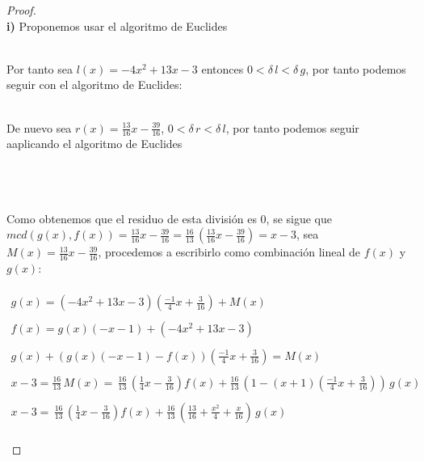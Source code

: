 \documentclass[11pt,letterpaper]{article}
\begin{document}
\begin{proof}\,\\
    \textbf{i)}\,\,Proponemos usar el algoritmo de Euclides
    \,\\
    \begin{center}
\end{center}\,\\
Por tanto sea $l(x)=-4x^2+13x-3$ entonces $0<\delta\,l< \delta\,g$, por tanto podemos seguir con el algoritmo 
de Euclides:\,\\
\begin{center}
\end{center}\,\\
De nuevo sea $r(x)=\frac{13}{16}x-\frac{39}{16}$, $0<\delta\,r<\delta\,l$, por tanto podemos seguir aaplicando el algoritmo de Euclides\,\\
\,\\
\begin{center}
\end{center}\,\\
\newpage
\,\\
Como obtenemos que el residuo de esta divisi\'on es $0$, se sigue que\\ $mcd(g(x),f(x))=\frac{13}{16}x-\frac{39}{16}=\frac{16}{13}\,(\frac{13}{16}x-\frac{39}{16})=x-3$, sea
$M(x)=\frac{13}{16}x-\frac{39}{16}$, procedemos a escribirlo como combinaci\'on lineal de $f(x)$ y $g(x)$:\,\\
\,\\
\begin{align*}
    g(x)=(-4x^2+13x-3)\left(\frac{-1}{4}x+\frac{3}{16}\right)+M(x)\,\\
    \,\\
    f(x)=g(x)(-x-1)+(-4x^2+13x-3)\,\\
    \,\\
    g(x)+(g(x)(-x-1)-f(x))\left(\frac{-1}{4}x+\frac{3}{16}\right)=M(x)\,\\
    \,\\
    x-3=\frac{16}{13}\,M(x)=\,\frac{16}{13}\,\left(\frac{1}{4}x-\frac{3}{16}\right)f(x)+\frac{16}{13}\,\left(1-(x+1)\left(\frac{-1}{4}x+\frac{3}{16}\right)\right)\,g(x)\,\\
    \,\\
    x-3=\,\frac{16}{13}\,\left(\frac{1}{4}x-\frac{3}{16}\right)f(x)+\frac{16}{13}\,\left(\frac{13}{16}+\frac{x^2}{4}+\frac{x}{16}\right)\,g(x)
\end{align*}\,\\

\end{proof}
\end{document}
